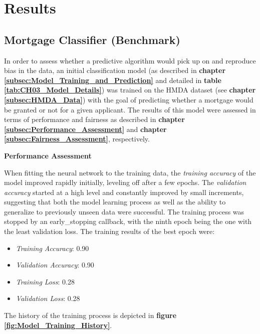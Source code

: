 \section{Results}\label{sec:Results}

\subsection{Mortgage Classifier (Benchmark)}\label{subsec:Mortgage Classifier (Benchmark) Results}

In order to assess whether a predictive algorithm would pick up on and reproduce bias in the data, an initial classification model (as described in \textbf{chapter \ref{subsec:Model_Training_and_Prediction}} and detailed in \textbf{table \ref{tab:CH03_Model_Details}}) was trained on the HMDA dataset (see \textbf{chapter \ref{subsec:HMDA_Data}}) with the goal of predicting whether a mortgage would be granted or not for a given applicant.
The results of this model were assessed in terms of performance and fairness as described in \textbf{chapter \ref{subsec:Performance_Assessment}} and \textbf{chapter \ref{subsec:Fairness_Assessment}}, respectively.

\textbf{Performance Assessment}

When fitting the neural network to the training data, the \textit{training accuracy} of the model improved rapidly initially, leveling off after a few epochs. The \textit{validation accuracy} started at a high level and constantly improved by small increments, suggesting that both the model learning process as well as the ability to generalize to previously unseen data were successful. 
The training process was stopped by an early\_stopping callback, with the ninth epoch being the one with the least validation loss. The training results of the best epoch were:
\begin{itemize}
    \item \textit{Training Accuracy}: 0.90
    \item \textit{Validation Accuracy}: 0.90
    \item \textit{Training Loss}: 0.28
    \item \textit{Validation Loss}: 0.28
\end{itemize}
The history of the training process is depicted in \textbf{figure \ref{fig:Model_Training_History}}.

